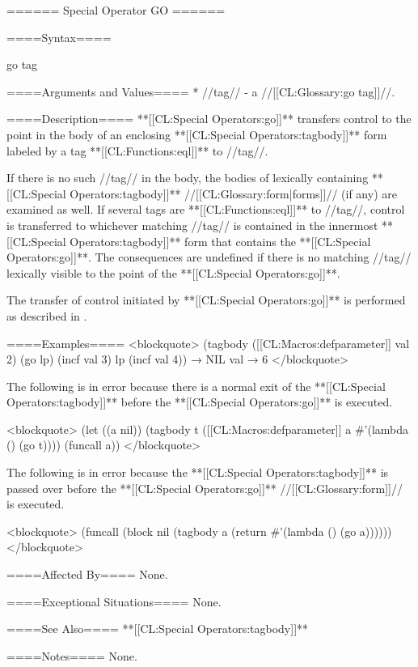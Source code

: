 ====== Special Operator GO ======

====Syntax====

\DefspecNoReturn go {tag}

====Arguments and Values====
  * //tag// - a //[[CL:Glossary:go tag]]//.

====Description====
**[[CL:Special Operators:go]]** transfers control to the point in the body of an enclosing **[[CL:Special Operators:tagbody]]** form labeled by a tag **[[CL:Functions:eql]]** to //tag//.

If there is no such //tag// in the body, the bodies of lexically containing **[[CL:Special Operators:tagbody]]** //[[CL:Glossary:form|forms]]// (if any) are examined as well. If several tags are **[[CL:Functions:eql]]** to //tag//, control is transferred to whichever matching //tag// is contained in the innermost **[[CL:Special Operators:tagbody]]** form that contains the **[[CL:Special Operators:go]]**. The consequences are undefined if there is no matching //tag// lexically visible to the point of the **[[CL:Special Operators:go]]**.

The transfer of control initiated by **[[CL:Special Operators:go]]** is performed as described in \secref\TransferOfControl.

====Examples==== 
<blockquote> (tagbody ([[CL:Macros:defparameter]] val 2) (go lp) (incf val 3) lp (incf val 4)) → NIL val → 6 </blockquote>

The following is in error because there is a normal exit of the **[[CL:Special Operators:tagbody]]** before the **[[CL:Special Operators:go]]** is executed.

<blockquote> (let ((a nil)) (tagbody t ([[CL:Macros:defparameter]] a #'(lambda () (go t)))) (funcall a)) </blockquote>

The following is in error because the **[[CL:Special Operators:tagbody]]** is passed over before the **[[CL:Special Operators:go]]** //[[CL:Glossary:form]]// is executed.

<blockquote> (funcall (block nil (tagbody a (return #'(lambda () (go a)))))) </blockquote>

====Affected By====
None.

====Exceptional Situations====
None.

====See Also====
**[[CL:Special Operators:tagbody]]**

====Notes====
None.


